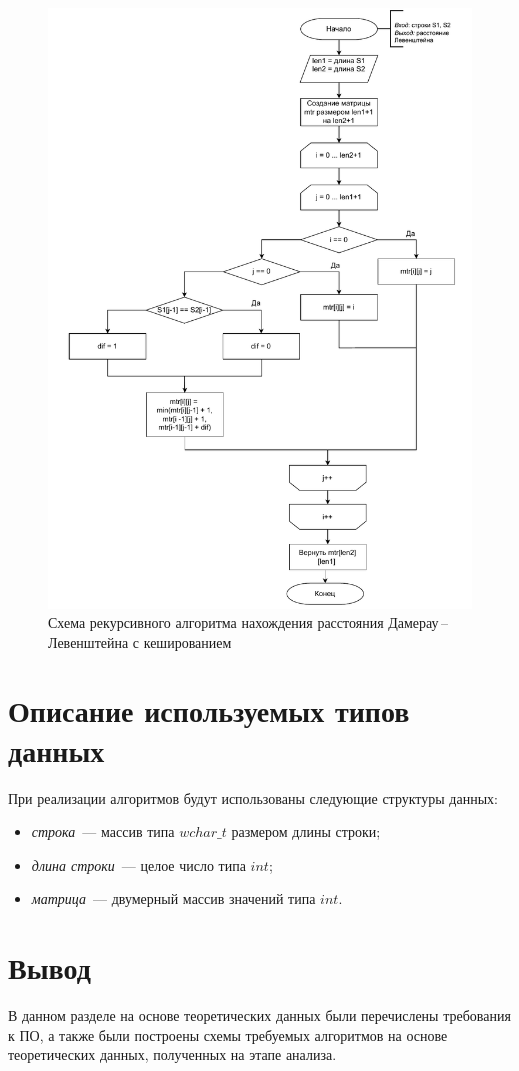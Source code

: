 \begin{figure}[h]
	\centering
	\includegraphics[height=0.9\textheight, page=4]{img/algoritms.pdf}
	\caption{Схема рекурсивного алгоритма нахождения расстояния Дамерау\,--\,Левенштейна с кешированием}
	\label{fig:DLrechash1}
\end{figure}

\clearpage

\section{Описание используемых типов данных}

При реализации алгоритмов будут использованы следующие структуры данных:

\begin{itemize}
	\item \textit{строка}~--- массив типа $wchar{\_}t$ размером длины строки;
	\item \textit{длина строки}~--- целое число типа $int$;
	\item \textit{матрица}~--- двумерный массив значений типа $int$.
\end{itemize}

\section*{Вывод}

В данном разделе на основе теоретических данных были перечислены требования к ПО, а также были построены схемы требуемых алгоритмов на основе теоретических данных, полученных на этапе анализа.